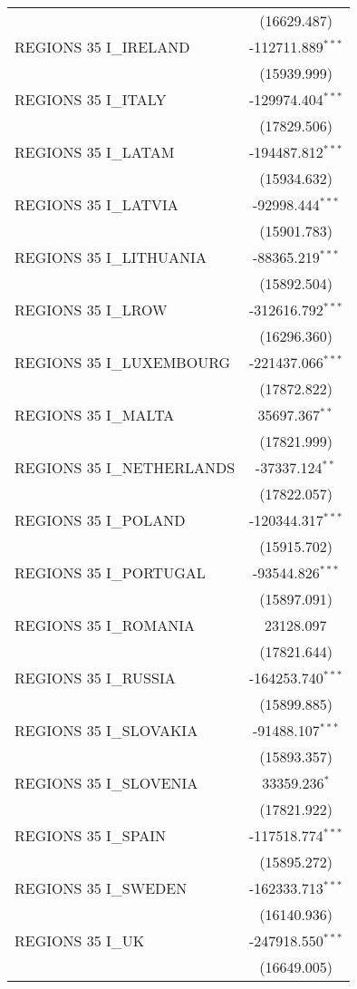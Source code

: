 \begin{table}[!htbp]
\begin{tabular}{@{\extracolsep{5pt}}lc}
& (16629.487) \\
 REGIONS 35 I\_IRELAND & -112711.889$^{***}$ \\
& (15939.999) \\
 REGIONS 35 I\_ITALY & -129974.404$^{***}$ \\
& (17829.506) \\
 REGIONS 35 I\_LATAM & -194487.812$^{***}$ \\
& (15934.632) \\
 REGIONS 35 I\_LATVIA & -92998.444$^{***}$ \\
& (15901.783) \\
 REGIONS 35 I\_LITHUANIA & -88365.219$^{***}$ \\
& (15892.504) \\
 REGIONS 35 I\_LROW & -312616.792$^{***}$ \\
& (16296.360) \\
 REGIONS 35 I\_LUXEMBOURG & -221437.066$^{***}$ \\
& (17872.822) \\
 REGIONS 35 I\_MALTA & 35697.367$^{**}$ \\
& (17821.999) \\
 REGIONS 35 I\_NETHERLANDS & -37337.124$^{**}$ \\
& (17822.057) \\
 REGIONS 35 I\_POLAND & -120344.317$^{***}$ \\
& (15915.702) \\
 REGIONS 35 I\_PORTUGAL & -93544.826$^{***}$ \\
& (15897.091) \\
 REGIONS 35 I\_ROMANIA & 23128.097$^{}$ \\
& (17821.644) \\
 REGIONS 35 I\_RUSSIA & -164253.740$^{***}$ \\
& (15899.885) \\
 REGIONS 35 I\_SLOVAKIA & -91488.107$^{***}$ \\
& (15893.357) \\
 REGIONS 35 I\_SLOVENIA & 33359.236$^{*}$ \\
& (17821.922) \\
 REGIONS 35 I\_SPAIN & -117518.774$^{***}$ \\
& (15895.272) \\
 REGIONS 35 I\_SWEDEN & -162333.713$^{***}$ \\
& (16140.936) \\
 REGIONS 35 I\_UK & -247918.550$^{***}$ \\
& (16649.005) \\

\end{tabular}
\end{table}
